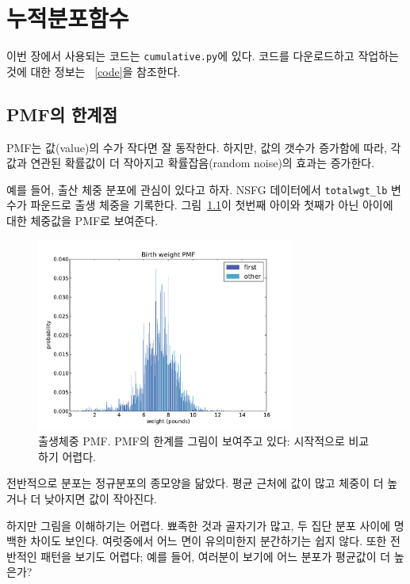 
\chapter{누적분포함수}
\label{cumulative}

이번 장에서 사용되는 코드는 {\tt cumulative.py}에 있다.
코드를 다운로드하고 작업하는 것에 대한 정보는 ~\ref{code}을 참조한다.


\section{PMF의 한계점}

PMF는 값(value)의 수가 작다면 잘 동작한다. 하지만, 값의 갯수가 증가함에 따라,
각 값과 연관된 확률값이 더 작아지고 확률잡음(random noise)의 효과는 증가한다.

예를 들어, 출산 체중 분포에 관심이 있다고 하자. NSFG 데이터에서 
\verb"totalwgt_lb" 변수가 파운드로 출생 체중을 기록한다.
그림~\ref{nsfg_birthwgt_pmf}이 첫번째 아이와 첫째가 아닌 아이에 대한 체중값을 
PMF로 보여준다.

\begin{figure}
\centerline{\includegraphics[height=2.5in]{figs/nsfg_birthwgt_pmf.pdf}}
\caption{출생체중 PMF. PMF의 한계를 그림이 보여주고 있다: 시작적으로 비교하기 어렵다.}
\label{nsfg_birthwgt_pmf}
\end{figure}

전반적으로 분포는 정규분포의 종모양을 닮았다.
평균 근처에 값이 많고 체중이 더 높거나 더 낮아지면 값이 작아진다.

하지만 그림을 이해하기는 어렵다. 뾰족한 것과 골자기가 많고, 두 집단 분포 사이에
명백한 차이도 보인다. 여럿중에서 어느 면이 유의미한지 분간하기는 쉽지 않다.
또한 전반적인 패턴을 보기도 어렵다; 예를 들어, 여러분이 보기에 어느 분포가 평균값이 더 높은가?

